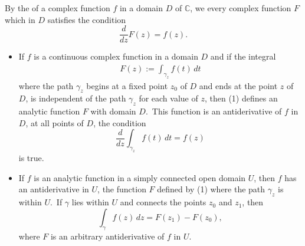 \documentclass[12pt]{article}
\theoremstyle{definition}
\begin{document}
By the {\em {}} of a complex function $f$ in a domain $D$ of $\mathbb{C}$, we  every complex function $F$ which in $D$ satisfies the condition
$$\frac{d}{dz}F(z) = f(z).$$

\begin{itemize}

\item If $f$ is a continuous complex function in a domain $D$ 
and if the integral
\begin{align}
F(z) := \int_{\gamma_z}f(t)\,dt
\end{align}
where the path ${\gamma_z}$ begins at a fixed point $z_0$ of 
$D$ and ends at the point $z$ of $D$, is independent of the 
path $\gamma_z$ for each value of $z$, then (1) defines an 
analytic function $F$ with domain $D$.\, This function is an 
antiderivative of $f$ in $D$,  at all 
points of $D$, the condition
$$\frac{d}{dz}\int_{\gamma_z}f(t)\,dt = f(z)$$
is true.

\item If $f$ is an analytic function in a simply connected open domain $U$, then $f$ has an antiderivative in $U$,  the function $F$ defined by (1) where the path $\gamma_z$ is within $U$.\, If $\gamma$ lies within $U$ and connects the points $z_0$ and $z_1$, then 
$$\int_{\gamma}f(z)\,dz = F(z_1)-F(z_0),$$
where $F$ is an arbitrary antiderivative of $f$ in $U$.

\end{itemize}
\end{document}

